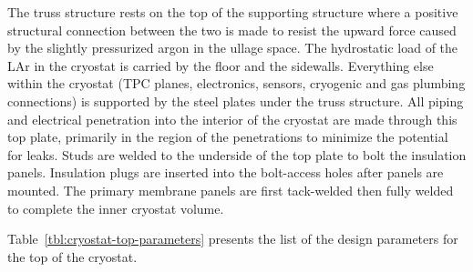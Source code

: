 The truss structure rests on the top of the supporting structure where a positive structural connection between the two is made to resist the upward force caused by the slightly pressurized argon in the ullage space. The hydrostatic load of the LAr in the cryostat is carried by the floor and the sidewalls. Everything else within the cryostat (TPC planes, electronics, sensors, cryogenic and gas plumbing connections) is supported by the steel plates under the truss structure. All piping and electrical penetration into the interior of the cryostat are made through this top plate, primarily in the region of the penetrations to minimize the potential for leaks. Studs are welded to the underside of the top plate to bolt the insulation panels. Insulation plugs are inserted into the bolt-access holes after panels are mounted. The primary membrane panels are first tack-welded then fully welded to complete the inner cryostat volume.

Table~\ref{tbl:cryostat-top-parameters} presents the list of the design parameters for the top of the cryostat.

